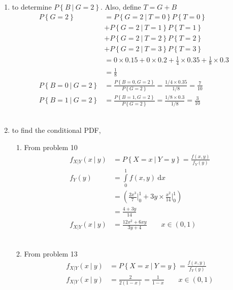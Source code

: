 \begin{enumerate}
	
	\item to determine $ P \left\{B\ |\ G = 2\right\} $. Also, define $ T = G+B $ \\
	
		\begin{align}
			P \left\{G = 2\right\} &= P \left\{G = 2\ |\ T = 0\right\}P \left\{T = 0\right\} \nonumber \\
			&+ P \left\{G = 2\ |\ T = 1\right\}P \left\{T = 1\right\} \nonumber \\ 
			&+ P \left\{G = 2\ |\ T = 2\right\}P \left\{T = 2\right\} \nonumber \\
			&+ P \left\{G = 2\ |\ T = 3\right\}P \left\{T = 3\right\} \nonumber \\
			&= 0 \times 0.15 + 0 \times 0.2 + \frac{1}{4} \times 0.35 + \frac{1}{8} \times 0.3 \nonumber \\
			&= \frac{1}{8} \\
			P \left\{B = 0\ |\ G = 2\right\} &= \frac{P \left\{B = 0, G = 2\right\}}{P \left\{G = 2\right\}} = \frac{1/4 \times 0.35}{1/8} = \frac{7}{10} \\
			P \left\{B = 1\ |\ G = 2\right\} &= \frac{P \left\{B = 1, G = 2\right\}}{P \left\{G = 2\right\}} = \frac{1/8 \times 0.3}{1/8} = \frac{3}{10}
		\end{align} \\
	
	
	\item to find the conditional PDF, \\
	
		\begin{enumerate}
			\item From problem 10 \\
			\begin{align}
				f_{X|Y}(x\ |\ y) &= P \left\{ X = x\ |\ Y = y \right\} = \frac{f(x, y)}{f_Y(y)}\nonumber\\
				f_Y (y) &= \int\limits_{0}^{1} f(x, y)\ \mathrm{d}x \nonumber \\
				&= \left( \frac{2x^3}{7} \Big|_0^1 + 3y \times \frac{x^2}{14}\Big|_0^1  \right) \nonumber \\
				&= \frac{4 + 3y}{14} \\
				f_{X|Y}(x\ |\ y) &= \frac{12x^2 + 6xy}{3y + 4} \qquad x \in \left(0, 1\right)
			\end{align} \\
			
			\item From problem 13 \\
			\begin{align}
				f_{X|Y}(x\ |\ y) &= P \left\{ X = x\ |\ Y = y \right\} = \frac{f(x, y)}{f_Y(y)}\nonumber\\
				f_{X|Y}(x\ |\ y) &= \frac{2}{2(1-x)} = \frac{1}{1-x} \qquad x \in \left(0, 1\right)
			\end{align} \\
		\end{enumerate}
	

\end{enumerate}

